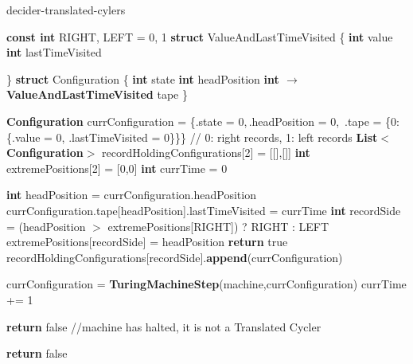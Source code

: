 \begin{algorithm}
        \caption{{\sc decider-translated-cylers}}\label{alg:translated-cyclers}

        \begin{algorithmic}[1]
          \State \textbf{const int} RIGHT, LEFT = 0, 1 
          \State \textbf{struct} ValueAndLastTimeVisited \{
            \State \tabi\textbf{int} value
            \State \tabi\textbf{int} lastTimeVisited
            

            \State \}
                \State \textbf{struct} Configuration \{
                \State \tabi\textbf{int} state
                \State \tabi\textbf{int} headPosition
                \State \tabi\textbf{int $\boldsymbol{\to}$ ValueAndLastTimeVisited} tape
                \State \}

                

                \State \textbf{Configuration} currConfiguration = \{.state = 0,$\,$.headPosition = 0,$\,$ .tape = \{0:\{.value = 0, .lastTimeVisited = 0\}\}\}
                \State // 0: right records, 1: left records
                \State \textbf{List$\boldsymbol{<}$Configuration$\boldsymbol{>}$} 
                recordHoldingConfigurations[2] = [[],[]] 
                \State \textbf{int} extremePositions[2] = [0,0]
                \State \textbf{int} currTime = 0

                \State \textbf{int} headPosition = currConfiguration.headPosition
                \State currConfiguration.tape[headPosition].lastTimeVisited = currTime
                \State \textbf{int} recordSide = (headPosition $>$ extremePositions[RIGHT]) ? RIGHT : LEFT
                \State extremePositions[recordSide] = headPosition
                \State \textbf{return} true
                \EndIf
                \State recordHoldingConfigurations[recordSide].\textbf{append}(currConfiguration)
                \EndIf

                \State currConfiguration = \textbf{TuringMachineStep}(machine,currConfiguration)
                \State currTime += 1


                \State \textbf{return} false //machine has halted, it is not a Translated Cycler
                \EndIf
                \EndWhile

                \State \textbf{return} false
                \EndProcedure

        \end{algorithmic}
      \end{algorithm}
